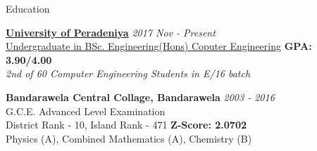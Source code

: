 \documentclass{resume} %
\begin{document}
\begin{rSection}{Education}

{\bf \href{http://eng.pdn.ac.lk}{University of Peradeniya}} \hfill {\em 2017 Nov - Present} 
\\ \href{http://www.ce.pdn.ac.lk/undergraduate-courses}{Undergraduate in BSc. Engineering(Hons) Coputer Engineering} \hfill {\bf  GPA: 3.90/4.00} 
\\ {\em 2nd of 60 Computer Engineering Students in E/16 batch}

{\bf{Bandarawela Central Collage, Bandarawela}} \hfill {\em 2003 - 2016} 
\\ G.C.E. Advanced Level Examination
\\ District Rank - 10, Island Rank - 471 \hfill {\bf  Z-Score: 2.0702}
\\ Physics (A), Combined Mathematics (A), Chemistry (B)



\end{rSection}
\end{document}
